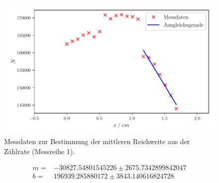 \begin{figure}[H]
  \centering
  \includegraphics[width=\textwidth]{build/plot1.pdf}
  \caption {Messdaten zur Bestimmung der mittleren Reichweite aus der Zählrate (Messreihe 1).}
  \label{fig:plot1}
\end{figure}
\begin{align*}
m =& -30827.54801545226 ± 2675.7342899842047\\
b =& 196939.285880172 ± 3843.140616824728
\end{align*}



